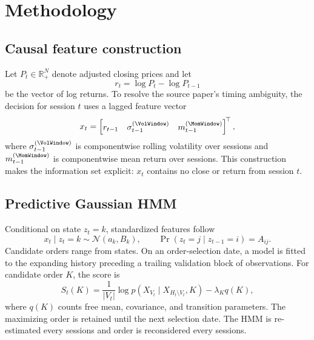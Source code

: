 \documentclass[11pt]{article}
\begin{document}
\section{Methodology}

\subsection{Causal feature construction}

Let \(P_t\in\mathbb{R}_{+}^{N}\) denote adjusted closing prices and let
\begin{equation}
  r_t = \log P_t - \log P_{t-1}
  \label{eq:returns}
\end{equation}
be the vector of log returns. To resolve the source paper's timing ambiguity, the decision for session \(t\) uses a lagged feature vector
\begin{equation}
  x_t = \begin{bmatrix}r_{t-1} & \sigma_{t-1}^{(\VolWindow)} & m_{t-1}^{(\MomWindow)}\end{bmatrix}^{\!\top},
  \label{eq:features}
\end{equation}
where \(\sigma_{t-1}^{(\VolWindow)}\) is componentwise rolling volatility over \VolWindow{} sessions and \(m_{t-1}^{(\MomWindow)}\) is componentwise mean return over \MomWindow{} sessions. This construction makes the information set explicit: \(x_t\) contains no close or return from session \(t\).

\subsection{Predictive Gaussian HMM}

Conditional on state \(z_t=k\), standardized features follow
\begin{equation}
  x_t\mid z_t=k \sim \mathcal{N}(a_k,B_k), \qquad
  \Pr(z_t=j\mid z_{t-1}=i)=A_{ij}.
  \label{eq:hmm}
\end{equation}
Candidate orders range from \CandidateStates{} states. On an order-selection date, a model is fitted to the expanding history preceding a trailing validation block of \ValidationDays{} observations. For candidate order \(K\), the score is
\begin{equation}
  S_t(K)=\frac{1}{|V_t|}\log p(X_{V_t}\mid X_{H_t\setminus V_t},K)-\lambda_K q(K),
  \label{eq:selection}
\end{equation}
where \(q(K)\) counts free mean, covariance, and transition parameters. The maximizing order is retained until the next selection date. The HMM is re-estimated every \RefitFrequency{} sessions and order is reconsidered every \OrderFrequency{} sessions.
\end{document}
